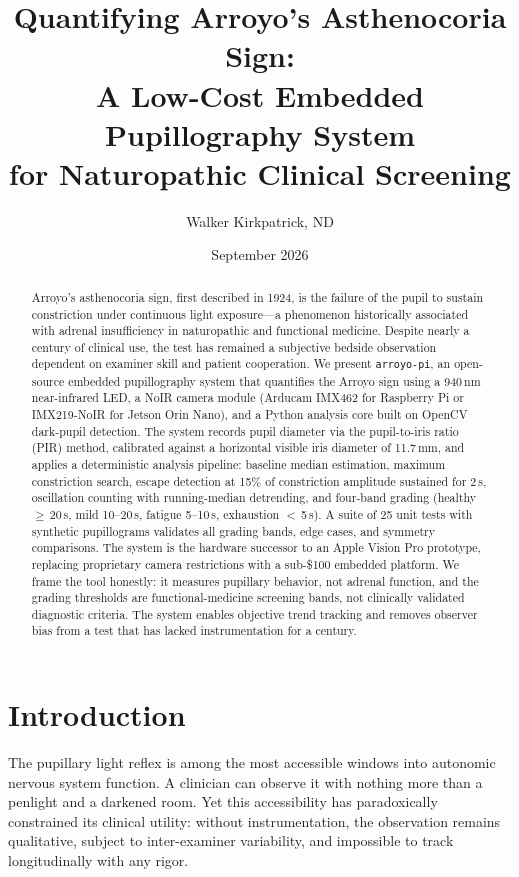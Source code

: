 \documentclass[11pt]{article}
\title{Quantifying Arroyo's Asthenocoria Sign: \\
A Low-Cost Embedded Pupillography System \\
for Naturopathic Clinical Screening}
\author{Walker Kirkpatrick, ND}
\date{September 2026}
\begin{document}
\maketitle

\begin{abstract}
Arroyo's asthenocoria sign, first described in 1924, is the failure of the pupil
to sustain constriction under continuous light exposure---a phenomenon
historically associated with adrenal insufficiency in naturopathic and
functional medicine. Despite nearly a century of clinical use, the test has
remained a subjective bedside observation dependent on examiner skill and
patient cooperation. We present \texttt{arroyo-pi}, an open-source embedded
pupillography system that quantifies the Arroyo sign using a 940\,nm
near-infrared LED, a NoIR camera module (Arducam IMX462 for Raspberry Pi or
IMX219-NoIR for Jetson Orin Nano), and a Python analysis core built on OpenCV
dark-pupil detection. The system records pupil diameter via the
pupil-to-iris ratio (PIR) method, calibrated against a horizontal visible iris
diameter of 11.7\,mm, and applies a deterministic analysis pipeline: baseline
median estimation, maximum constriction search, escape detection at 15\% of
constriction amplitude sustained for 2\,s, oscillation counting with
running-median detrending, and four-band grading (healthy $\geq$\,20\,s, mild
10--20\,s, fatigue 5--10\,s, exhaustion $<$\,5\,s). A suite of 25 unit tests
with synthetic pupillograms validates all grading bands, edge cases, and
symmetry comparisons. The system is the hardware successor to an Apple Vision
Pro prototype, replacing proprietary camera restrictions with a sub-\$100
embedded platform. We frame the tool honestly: it measures pupillary behavior,
not adrenal function, and the grading thresholds are functional-medicine
screening bands, not clinically validated diagnostic criteria. The system
enables objective trend tracking and removes observer bias from a test that
has lacked instrumentation for a century.
\end{abstract}

\section{Introduction}

The pupillary light reflex is among the most accessible windows into autonomic
nervous system function. A clinician can observe it with nothing more than a
penlight and a darkened room. Yet this accessibility has paradoxically
constrained its clinical utility: without instrumentation, the observation
remains qualitative, subject to inter-examiner variability, and impossible to
track longitudinally with any rigor.
\end{document}

